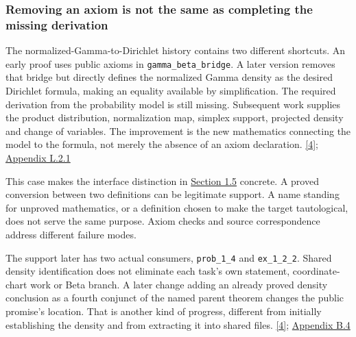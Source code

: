 \subsubsection[Removing an axiom is not the same as completing the missing derivation]{\texorpdfstring{\protect\hypertarget{r3-1}{}Removing an axiom is not the same as completing the missing derivation}{Removing an axiom is not the same as completing the missing derivation}}
The normalized-Gamma-to-Dirichlet history contains two different shortcuts. An early proof uses public axioms in \nolinkurl{gamma_beta_bridge}. A later version removes that bridge but directly defines the normalized Gamma density as the desired Dirichlet formula, making an equality available by simplification. The required derivation from the probability model is still missing. Subsequent work supplies the product distribution, normalization map, simplex support, projected density and change of variables. The improvement is the new mathematics connecting the model to the formula, not merely the absence of an axiom declaration. \href{en.pdf\#ref-4}{\mbox{[4]}}; \href{en-appendix.pdf\#l2-1}{Appendix L.2.1}

This case makes the interface distinction in \href{en.pdf\#section-1-5}{Section 1.5} concrete. A proved conversion between two definitions can be legitimate support. A name standing for unproved mathematics, or a definition chosen to make the target tautological, does not serve the same purpose. Axiom checks and source correspondence address different failure modes.

The support later has two actual consumers, \nolinkurl{prob_1_4} and \nolinkurl{ex_1_2_2}. Shared density identification does not eliminate each task's own statement, coordinate-chart work or Beta branch. A later change adding an already proved density conclusion as a fourth conjunct of the named parent theorem changes the public promise's location. That is another kind of progress, different from initially establishing the density and from extracting it into shared files. \href{en.pdf\#ref-4}{\mbox{[4]}}; \href{en-appendix.pdf\#b4}{Appendix B.4}


